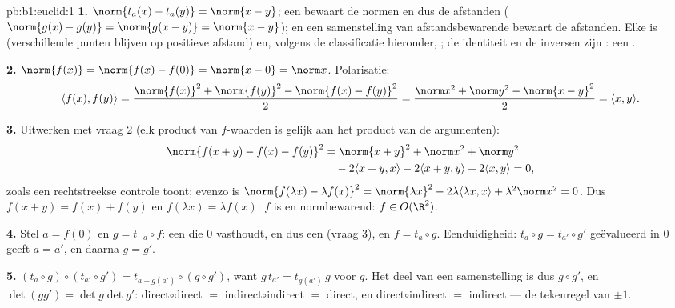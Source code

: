 \begin{solution}{pb:b1:euclid:1}
\textbf{1.} $\norm{t_a(x) - t_a(y)} = \norm{x - y}$; een 
 bewaart de normen en dus de afstanden ($\norm{g(x) -
g(y)} = \norm{g(x - y)} = \norm{x-y}$); en een samenstelling van
afstandsbewarende  bewaart de afstanden. Elke 
is  (verschillende punten blijven op positieve afstand)
en, volgens de classificatie hieronder, ; de identiteit en
de inversen zijn : een .

\textbf{2.} $\norm{f(x)} = \norm{f(x) - f(0)} = \norm{x - 0} =
\norm x$. Polarisatie:
\[
\langle f(x), f(y)\rangle
= \frac{\norm{f(x)}^2 + \norm{f(y)}^2 - \norm{f(x) -
f(y)}^2}{2}
= \frac{\norm x^2 + \norm y^2 - \norm{x - y}^2}{2}
= \langle x, y\rangle .
\]

\textbf{3.} Uitwerken met vraag 2 (elk product van $f$-waarden is
gelijk aan het product van de argumenten):
\begin{align*}
\norm{f(x+y) - f(x) - f(y)}^2
&= \norm{x+y}^2 + \norm x^2 + \norm y^2\\
&\quad - 2\langle x+y, x\rangle - 2\langle x+y, y\rangle
+ 2\langle x, y\rangle = 0 ,
\end{align*}
zoals een rechtstreekse controle toont; evenzo is
$\norm{f(\lambda x) - \lambda f(x)}^2 = \norm{\lambda x}^2 -
2\lambda\langle \lambda x, x\rangle + \lambda^2\norm x^2 = 0$. Dus
$f(x + y) = f(x) + f(y)$ en $f(\lambda x) = \lambda f(x)$: $f$ is
 en normbewarend: $f \in O(\R^2)$.

\textbf{4.} Stel $a = f(0)$ en $g = t_{-a}\circ f$: een 
die $0$ vasthoudt, en dus een   (vraag 3), en $f =
t_a \circ g$. Eenduidigheid: $t_a \circ g = t_{a'}\circ g'$
geëvalueerd in $0$ geeft $a = a'$, en daarna $g = g'$.

\textbf{5.} $(t_a\circ g)\circ(t_{a'}\circ g') = t_{a +
g(a')}\circ(g\circ g')$, want $g\,t_{a'} = t_{g(a')}\,g$ voor
 $g$. Het  deel van een samenstelling is dus $g
\circ g'$, en $\det(gg') = \det g \det g'$:
direct$\circ$direct $=$ indirect$\circ$indirect $=$ direct, en
direct$\circ$indirect $=$ indirect --- de tekenregel van $\pm1$.


\end{solution}

